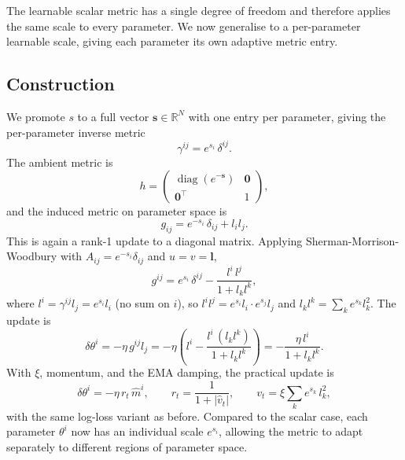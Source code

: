 \documentclass{article}
\newcommand{\vecb}[1]{\boldsymbol{#1}}
\begin{document}
The learnable scalar metric has a single degree of freedom and therefore applies
the same scale to every parameter.
We now generalise to a per-parameter learnable scale,
giving each parameter its own adaptive metric entry.

\subsection{Construction}
We promote $s$ to a full vector $\vecb{s}\in\mathbb{R}^N$ with one entry per parameter,
giving the per-parameter inverse metric $$
    \gamma^{ij} = e^{s_i}\,\delta^{ij}.
$$
The ambient metric is $$
    h = \begin{pmatrix} \operatorname{diag}(e^{-\vecb{s}}) & \vecb{0} \\ \vecb{0}^\top & 1 \end{pmatrix},
$$ and the induced metric on parameter space is $$
    g_{ij} = e^{-s_i}\,\delta_{ij} + l_i l_j.
$$
This is again a rank-1 update to a diagonal matrix.
Applying Sherman-Morrison-Woodbury with $A_{ij} = e^{-s_i}\delta_{ij}$ and $u=v=\vecb{l}$,
$$
    g^{ij} = e^{s_i}\,\delta^{ij} - \frac{l^i\,l^j}{1 + l_k l^k},
$$
where $l^i = \gamma^{ij}l_j = e^{s_i}l_i$ (no sum on $i$),
so $l^i l^j = e^{s_i}l_i\cdot e^{s_j}l_j$ and $l_k l^k = \sum_k e^{s_k}l_k^2$.
The update is
\begin{equation}\label{eq:diag-theory}
    \delta\theta^i
    = -\eta\,g^{ij}l_j
    = -\eta\left(l^i - \frac{l^i\,(l_k l^k)}{1+l_k l^k}\right)
    = -\frac{\eta\,l^i}{1+l_k l^k}.
\end{equation}
With $\xi$, momentum, and the EMA damping, the practical update is
\begin{equation}\label{eq:diag-update}
    \delta\theta^i = -\eta\,r_t\,\hat{m}^i, \qquad
    r_t = \frac{1}{1 + |\hat{v}_t|}, \qquad
    v_t = \xi\sum_k e^{s_k}\,l_k^2,
\end{equation}
with the same log-loss variant as before.
Compared to the scalar case, each parameter $\theta^i$ now has an individual scale $e^{s_i}$,
allowing the metric to adapt separately to different regions of parameter space.
\end{document}
